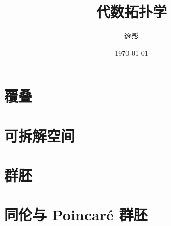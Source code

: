 \documentclass[UTF8,10pt, a4paper, oneside,scheme=plain]{ctexbook}
\author{逐影}
\title{\Huge\textbf{代数拓扑学}}
\date{\today}
\begin{document}
\frontmatter
\maketitle
\tableofcontents
\mainmatter

\part{覆叠}


\part{可拆解空间}


\part{群胚}


\part{同伦与 Poincaré 群胚}


\backmatter
\end{document}
